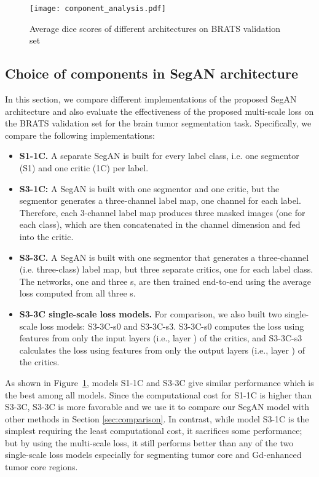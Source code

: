 \documentclass[twocolumn]{svjour3}
\begin{document}
\begin{figure}[!htbp]
  \centering
\texttt{[image: component\_analysis.pdf]}\caption{Average dice scores of different architectures on BRATS validation set}
\label{fig:component}
\end{figure}




\subsection{Choice of components in SegAN architecture}

In this section, we compare different implementations of the proposed SegAN architecture and also evaluate the effectiveness of the proposed multi-scale  loss on the BRATS validation set for the brain tumor segmentation task.
Specifically, we compare the following implementations:
\begin{itemize}
\vspace{-6pt}
\item \textbf{S1-1C.}  A separate SegAN is built for every label class, i.e. one segmentor (S1) and one critic (1C) per label.
\item \textbf{S3-1C:} A SegAN is built with one segmentor and one critic, but the segmentor generates a three-channel label map, one channel for each label. Therefore, each 3-channel label map produces three masked images (one for each class), which are then concatenated in the channel dimension and fed into the critic.
\item \textbf{S3-3C.} A SegAN is built with one segmentor that generates a three-channel (i.e. three-class) label map, but three separate critics, one for each label class. The networks, one  and three s, are then trained end-to-end using the average loss computed from all three s.
\item \textbf{S3-3C single-scale loss models.} For comparison, we also built two single-scale loss models: S3-3C-s0 and S3-3C-s3. S3-3C-s0 computes the loss using features from only the input layers (i.e., layer ) of the critics, and S3-3C-s3 calculates the loss using features from only the output layers (i.e., layer ) of the critics.
\end{itemize}
As shown in Figure~\ref{fig:component}, models S1-1C and S3-3C give similar performance which is the best among all models. Since the computational cost for S1-1C is higher than S3-3C, S3-3C is more favorable and we use it to compare our SegAN model with other methods in Section \ref{sec:comparison}.
In contrast, while model S3-1C is the simplest requiring the least computational cost, it sacrifices some performance; but by using the multi-scale loss, it still performs better than any of the two single-scale loss models especially for segmenting tumor core and Gd-enhanced tumor core regions.
\end{document}
